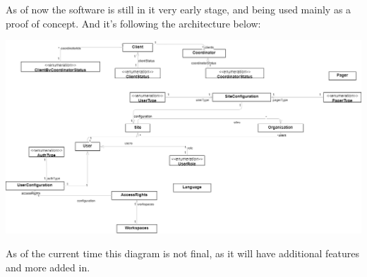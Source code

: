 As of now the software is still in it very early stage, and being used mainly as a proof of concept.
And it's following the architecture below:

\begin{center}
    \includegraphics[width=1\textwidth]{images/package.drawio}
\end{center}

As of the current time this diagram is not final, as it will have additional features and more added in.